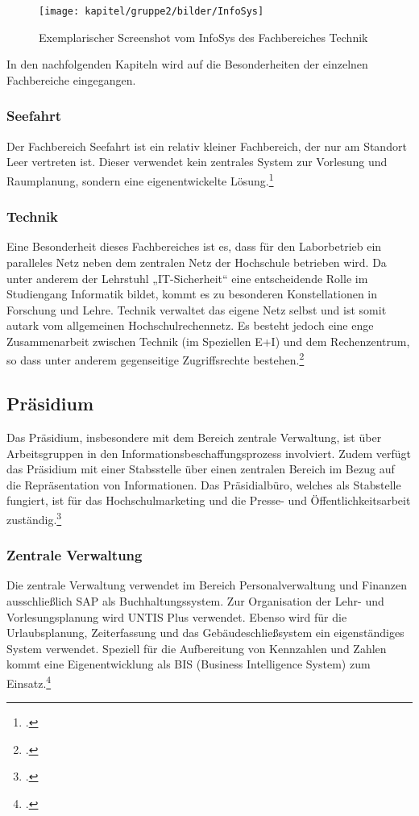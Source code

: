 \begin{figure}[h!]
	\centering
	\texttt{[image: kapitel/gruppe2/bilder/InfoSys]}
	\caption{Exemplarischer Screenshot vom InfoSys des Fachbereiches Technik\protect\footnotemark}
	\label{fig_InfoSys}
\end{figure}

In den nachfolgenden Kapiteln wird auf die Besonderheiten der einzelnen Fachbereiche eingegangen.

\subsubsection{Seefahrt}
Der Fachbereich Seefahrt ist ein relativ kleiner Fachbereich, der nur am Standort Leer vertreten ist. Dieser verwendet kein zentrales System zur Vorlesung und Raumplanung, sondern eine eigenentwickelte Lösung.\footcite{gunter_muller_interview}

\subsubsection{Technik}
Eine Besonderheit dieses Fachbereiches ist es, dass für den Laborbetrieb ein paralleles Netz neben dem zentralen Netz der Hochschule betrieben wird. Da unter anderem der Lehrstuhl „IT-Sicherheit“ eine entscheidende Rolle im Studiengang Informatik bildet, kommt es zu besonderen Konstellationen in Forschung und Lehre. Technik verwaltet das eigene Netz selbst und ist somit autark vom allgemeinen Hochschulrechennetz. Es besteht jedoch eine enge Zusammenarbeit zwischen Technik (im Speziellen E+I) und dem Rechenzentrum, so dass unter anderem gegenseitige Zugriffsrechte bestehen.\footcite{gunter_muller_interview} 

\subsection{Präsidium}
\label{praesidium_label}

Das Präsidium, insbesondere mit dem Bereich zentrale Verwaltung, ist über  Arbeitsgruppen in den Informationsbeschaffungsprozess involviert. Zudem verfügt das Präsidium mit einer Stabsstelle über einen zentralen Bereich im Bezug auf die Repräsentation von Informationen. Das Präsidialbüro, welches als Stabstelle fungiert, ist für das Hochschulmarketing und die Presse- und Öffentlichkeitsarbeit zuständig.\footcite{hsel_organigramm_2015}

\subsubsection{Zentrale Verwaltung}
Die zentrale Verwaltung verwendet im Bereich Personalverwaltung und Finanzen ausschließlich SAP als Buchhaltungssystem. Zur Organisation der Lehr- und Vorlesungsplanung wird UNTIS Plus verwendet. Ebenso wird für die Urlaubsplanung, Zeiterfassung und das Gebäudeschließsystem ein eigenständiges System verwendet. Speziell für die Aufbereitung von Kennzahlen und Zahlen kommt eine Eigenentwicklung als BIS (Business Intelligence System) zum Einsatz.\footcite{gunter_muller_interview}


